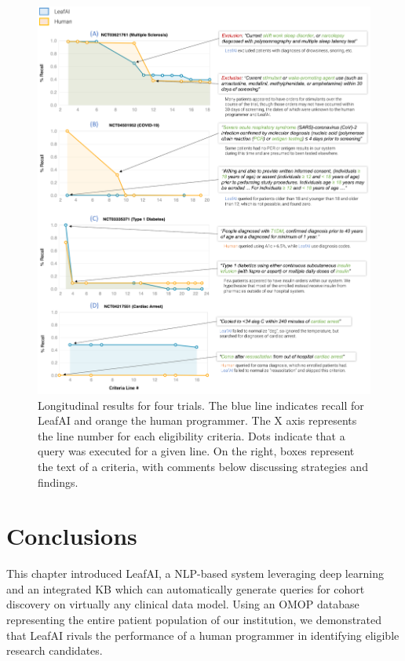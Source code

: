 \documentclass[../main.tex]{subfiles}
\begin{document}
\begin{figure}[H]
  \begin{center}
    \includegraphics[scale=0.54]{Figures/7_query_generation/leafai_analysis.pdf} 
  \end{center}
  \caption{Longitudinal results for four trials. The blue line indicates recall for LeafAI and orange the human programmer. The X axis represents the line number for each eligibility criteria. Dots indicate that a query was executed for a given line. On the right, boxes represent the text of a criteria, with comments below discussing strategies and findings.}
  \label{fig_leafai_results_analysis}
\end{figure}

\section{Conclusions}

This chapter introduced LeafAI, a NLP-based system leveraging deep learning and an integrated KB which can automatically generate queries for cohort discovery on virtually any clinical data model. Using an OMOP database representing the entire patient population of our institution, we demonstrated that LeafAI rivals the  performance of a human programmer in identifying eligible research candidates.
\end{document}
